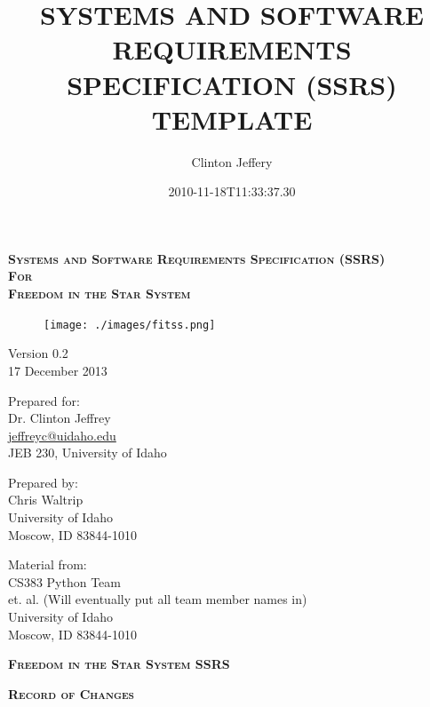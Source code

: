 \documentclass[twoside,letterpaper]{article}
\title{SYSTEMS AND SOFTWARE REQUIREMENTS SPECIFICATION (SSRS) TEMPLATE}
\author{Clinton Jeffery}
\date{2010-11-18T11:33:37.30}
\begin{document}
\setlength{\aboverulesep}{0pt}
\setlength{\belowrulesep}{0pt}
\setlength{\extrarowheight}{.75ex}

\begin{minipage}{\linewidth}
\centering
\textsc{
	\textbf{
		Systems and Software Requirements Specification (SSRS) 	\\
							For								   	\\
							\vspace{1em}
						{\Large Freedom in the Star System}		\\
}}
\end{minipage}

\vspace{2em}

\begin{figure}[h]
\centering
\texttt{[image: ./images/fitss.png]}
\end{figure}

\begin{minipage}{\linewidth}
\centering
Version 0.2\\
17 December 2013\\

\vspace{2em}

Prepared for:\\
Dr. Clinton Jeffrey\\
\url{jeffreyc@uidaho.edu}\\
JEB 230, University of Idaho

\vspace{2em}

Prepared by:\\
Chris Waltrip\\
University of Idaho\\
Moscow, ID 83844-1010

\vspace{2em}

Material from:\\
CS383 Python Team\\
et. al. (Will eventually put all team member names in)\\
University of Idaho\\
Moscow, ID 83844-1010
\end{minipage}


\clearpage
\begin{minipage}{\linewidth}
\centering
\textsc{
	\textbf{Freedom in the Star System SSRS}}

\vspace{2em}

\textsc{
	\textbf{Record of Changes}}
	
\end{minipage}
\end{document}
